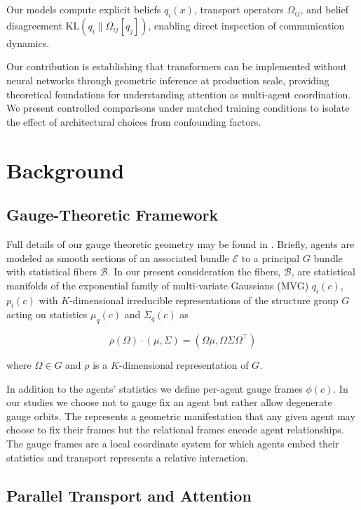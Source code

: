 \documentclass[twoside,11pt]{article}
\begin{document}
Our models compute explicit beliefs $q_i(x)$, transport operators $\Omega_{ij}$, and belief disagreement $\mathrm{KL}(q_i \| \Omega_{ij}[q_j])$, enabling direct inspection of communication dynamics.

Our contribution is establishing that transformers can be implemented without neural networks through geometric inference at production scale, providing theoretical foundations for understanding attention as multi-agent coordination. We present controlled comparisons under matched training conditions to isolate the effect of architectural choices from confounding factors.


\section{Background}
\label{sec:background}

\subsection{Gauge-Theoretic Framework}

Full details of our gauge theoretic geometry may be found in \cite{Dennis2025}. Briefly, agents are modeled as smooth sections of an associated bundle $\mathcal{E}$ to a principal $G$ bundle with statistical fibers $\mathcal{B}$. In our present consideration the fibers,  $\mathcal{B}$, are statistical manifolds of the exponential family of multi-variate Gaussians (MVG) $q_i(c)$, $p_i(c)$ with $K$-dimensional irreducible representations of the structure group $G$ acting on statistics $\mu_q(c)$ and $\Sigma_q(c)$ as

\begin{equation}
    \rho(\Omega) \cdot (\mu, \Sigma) = (\Omega\mu, \Omega\Sigma\Omega^\top)
\end{equation}

where $\Omega \in G$ and $\rho$ is a $K$-dimensional representation of $G$.

In addition to the agents' statistics we define per-agent gauge frames $\phi(c)$.  In our studies we choose not to gauge fix an agent but rather allow degenerate gauge orbits.  The represents a geometric manifestation that any given agent may choose to fix their frames but the relational frames encode agent relationships. The gauge frames are a local coordinate system for which agents embed their statistics and transport represents a relative interaction.


\subsection{Parallel Transport and Attention}
\end{document}
